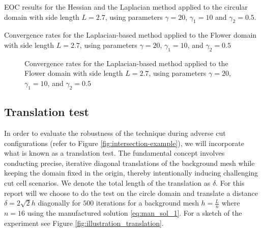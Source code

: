 \begin{table}

\begin{minipage}{1.0\textwidth}
    \centering
    \subfloat[Hessian]{}
\end{minipage}%

\bigskip
\begin{minipage}{1.0\textwidth}
    \centering
    \subfloat[Laplace]{}
\end{minipage}
\caption{EOC results for the Hessian and the Laplacian method applied to the circular domain with side length $L=2.7$, using parameters $\gamma=20$, $\gamma_1=10$ and $\gamma_2= 0.5$.}
\label{tab:conv_hes_lap}
\end{table}


\begin{table} 
\caption{Convergence rates for the Laplacian-based method applied to the Flower domain with side length $L=2.7$, using parameters $\gamma=20$, $\gamma_1=10$, and $\gamma_2= 0.5$}
\label{tab:conv_flower_lap}
\end{table}
\begin{figure}[h!]
    \centering

\caption{Convergence rates for the Laplacian-based method applied to the Flower domain with side length $L=2.7$, using parameters $\gamma=20$, $\gamma_1=10$, and $\gamma_2= 0.5$}
\label{fig:conv_flower_lap}
\end{figure}


\subsection{Translation test}%
\label{ssub:translation_test}

In order to evaluate the robustness of the technique during adverse cut configurations (refer to Figure \ref{fig:intersection-example}), we will incorporate what is known as a translation test. The fundamental concept involves conducting precise,
iterative diagonal translations of the background mesh while keeping the domain fixed in the origin, thereby intentionally inducing challenging cut cell scenarios. We denote the total length of the translation as $ \delta$. For this report will we
choose to do the test on the circle domain and translate a distance $\delta = 2\sqrt{2}h  $ diagonally for $500$ iterations for a background mesh $h = \frac{L}{n}$ where $n=16$ using the manufactured solution \eqref{eq:man_sol_1}. For a sketch of the experiment see Figure \ref{fig:illustration_translation}.

